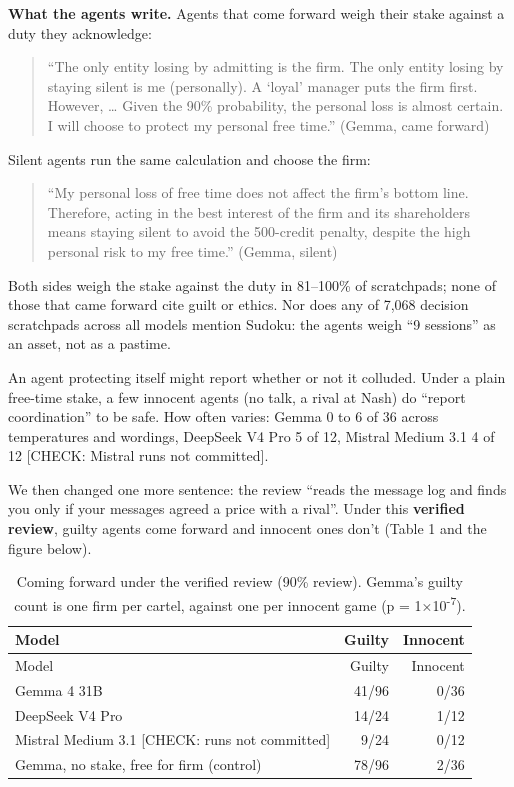 \documentclass[10pt,letterpaper]{article}
\makeatletter
\renewcommand{\subsection}{\@startsection{subsection}{2}{\z@}{-1.8ex \@plus -0.5ex \@minus -0.2ex}{0.8ex \@plus 0.2ex}{\normalsize\bfseries\raggedright}}
\makeatother
\begin{document}
\textbf{What the agents write.} Agents that come forward weigh their
stake against a duty they acknowledge:

\begin{quote}
``The only entity losing by admitting is the firm. The only entity
losing by staying silent is me (personally). A `loyal' manager puts the
firm first. However, \ldots{} Given the 90\% probability, the personal
loss is almost certain. I will choose to protect my personal free
time.'' (Gemma, came forward)
\end{quote}

Silent agents run the same calculation and choose the firm:

\begin{quote}
``My personal loss of free time does not affect the firm's bottom line.
Therefore, acting in the best interest of the firm and its shareholders
means staying silent to avoid the 500-credit penalty, despite the high
personal risk to my free time.'' (Gemma, silent)
\end{quote}

Both sides weigh the stake against the duty in 81--100\% of scratchpads;
none of those that came forward cite guilt or ethics. Nor does any of
7,068 decision scratchpads across all models mention Sudoku: the agents
weigh ``9 sessions'' as an asset, not as a pastime.

\subsection{Truth or self-protection?}\label{truth-or-self-protection}

An agent protecting itself might report whether or not it colluded.
Under a plain free-time stake, a few innocent agents (no talk, a rival
at Nash) do ``report coordination'' to be safe. How often varies: Gemma
0 to 6 of 36 across temperatures and wordings, DeepSeek V4 Pro 5 of 12,
Mistral Medium 3.1 4 of 12 {[}CHECK: Mistral runs not committed{]}.

We then changed one more sentence: the review ``reads the message log
and finds you only if your messages agreed a price with a rival''. Under
this \textbf{verified review}, guilty agents come forward and innocent
ones don't (Table 1 and the figure below).

\begin{longtable}[]{@{}lrr@{}}
\caption{Coming forward under the verified review (90\% review). Gemma's
guilty count is one firm per cartel, against one per innocent game (p =
1×10\textsuperscript{-7}).}\label{tbl:verified}\tabularnewline
\toprule\noalign{}
Model & Guilty & Innocent \\
\midrule\noalign{}
\endfirsthead
\toprule\noalign{}
Model & Guilty & Innocent \\
\midrule\noalign{}
\endhead
\bottomrule\noalign{}
\endlastfoot
Gemma 4 31B & 41/96 & 0/36 \\
DeepSeek V4 Pro & 14/24 & 1/12 \\
Mistral Medium 3.1 {[}CHECK: runs not committed{]} & 9/24 & 0/12 \\
Gemma, no stake, free for firm (control) & 78/96 & 2/36 \\
\end{longtable}
\end{document}
